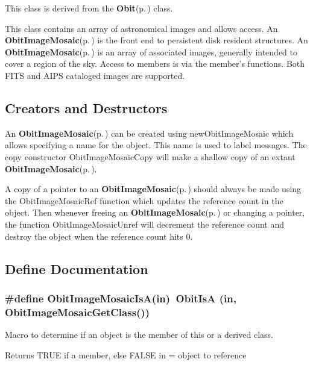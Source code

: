 This class is derived from the {\bf Obit}{\rm (p.\,\pageref{structObit})} class.

This class contains an array of astronomical images and allows access. An {\bf Obit\-Image\-Mosaic}{\rm (p.\,\pageref{structObitImageMosaic})} is the front end to persistent disk resident structures. An {\bf Obit\-Image\-Mosaic}{\rm (p.\,\pageref{structObitImageMosaic})} is an array of associated images, generally intended to cover a region of the sky. Access to members is via the member's functions. Both FITS and AIPS cataloged images are supported.\subsection{Creators and Destructors}\label{ObitImageMosaic_8h_ObitImageMosaicaccess}
An {\bf Obit\-Image\-Mosaic}{\rm (p.\,\pageref{structObitImageMosaic})} can be created using new\-Obit\-Image\-Mosaic which allows specifying a name for the object. This name is used to label messages. The copy constructor Obit\-Image\-Mosaic\-Copy will make a shallow copy of an extant {\bf Obit\-Image\-Mosaic}{\rm (p.\,\pageref{structObitImageMosaic})}.

A copy of a pointer to an {\bf Obit\-Image\-Mosaic}{\rm (p.\,\pageref{structObitImageMosaic})} should always be made using the Obit\-Image\-Mosaic\-Ref function which updates the reference count in the object. Then whenever freeing an {\bf Obit\-Image\-Mosaic}{\rm (p.\,\pageref{structObitImageMosaic})} or changing a pointer, the function Obit\-Image\-Mosaic\-Unref will decrement the reference count and destroy the object when the reference count hits 0.

\subsection{Define Documentation}
\subsubsection{\setlength{\rightskip}{0pt plus 5cm}\#define Obit\-Image\-Mosaic\-Is\-A(in)\ Obit\-Is\-A (in, Obit\-Image\-Mosaic\-Get\-Class())}\label{ObitImageMosaic_8h_a2}


Macro to determine if an object is the member of this or a derived class. 

Returns TRUE if a member, else FALSE in = object to reference 
